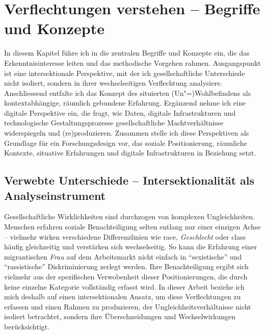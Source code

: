 
\chapter{Verflechtungen verstehen -- Begriffe und Konzepte} \label{sec:theoretischer_rahmen}

In diesem Kapitel führe ich in die zentralen Begriffe und Konzepte ein, die das Erkenntnisinteresse leiten und das methodische Vorgehen rahmen. Ausgangspunkt ist eine intersektionale Perspektive, mit der ich gesellschaftliche Unterschiede nicht isoliert, sondern in ihrer wechselseitigen Verflechtung analysiere. Anschliessend entfalte ich das Konzept des situierten (Un\nobreakdash"=)Wohlbefindens als kontextabhängige, räumlich gebundene Erfahrung. Ergänzend nehme ich eine digitale Perspektive ein, die fragt, wie Daten, digitale Infrastrukturen und technologische Gestaltungsprozesse gesellschaftliche Machtverhältnisse widerspiegeln und (re)produzieren. Zusammen stelle ich diese Perspektiven als Grundlage für ein Forschungsdesign vor, das soziale Positionierung, räumliche Kontexte, situative Erfahrungen und digitale Infrastrukturen in Beziehung setzt.

\section{Verwebte Unterschiede -- Intersektionalität als Analyseinstrument}

Gesellschaftliche Wirklichkeiten sind durchzogen von komplexen Ungleichheiten. Menschen erfahren soziale Benachteiligung selten entlang nur einer einzigen Achse -- vielmehr wirken verschiedene Differenzlinien wie \gls{race}, \emph{Geschlecht} oder \gls{class} häufig gleichzeitig und verstärken sich wechselseitig. So kann die Erfahrung einer migrantischen \emph{Frau} auf dem Arbeitsmarkt nicht einfach in \enquote{sexistische} und \enquote{rassistische} Diskriminierung zerlegt werden. Ihre Benachteiligung ergibt sich vielmehr aus der spezifischen Verwobenheit dieser Positionierungen, die durch keine einzelne Kategorie vollständig erfasst wird. In dieser Arbeit beziehe ich mich deshalb auf einen intersektionalen Ansatz, um diese Verflechtungen zu erfassen und einen Rahmen zu produzieren, der Ungleichheitsverhältnisse nicht isoliert betrachtet, sondern ihre Überschneidungen und Wechselwirkungen berücksichtigt.

